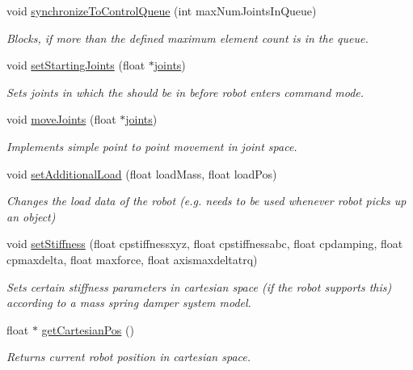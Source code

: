 \begin{DoxyCompactItemize}
void \hyperlink{classKukaControlQueue_a3e59c3d253d2306b5fdde56da529c9cd}{synchronize\-To\-Control\-Queue} (int max\-Num\-Joints\-In\-Queue)
\begin{DoxyCompactList}\small\item\em \-Blocks, if more than the defined maximum element count is in the queue. \end{DoxyCompactList}\item 
void \hyperlink{classKukaControlQueue_ae9b6465ad4c714b305af4eb0b8e69584}{set\-Starting\-Joints} (float $\ast$\hyperlink{fri__example_8m_a094bd681592faefb6f9be3d22d34cbcd}{joints})
\begin{DoxyCompactList}\small\item\em \-Sets joints in which the should be in before robot enters command mode. \end{DoxyCompactList}\item 
void \hyperlink{classKukaControlQueue_a2b9e7cfb4918201e1da5e2a365395e46}{move\-Joints} (float $\ast$\hyperlink{fri__example_8m_a094bd681592faefb6f9be3d22d34cbcd}{joints})
\begin{DoxyCompactList}\small\item\em \-Implements simple point to point movement in joint space. \end{DoxyCompactList}\item 
void \hyperlink{classKukaControlQueue_a0c6a2edd22e222c672668fac5cacb55a}{set\-Additional\-Load} (float load\-Mass, float load\-Pos)
\begin{DoxyCompactList}\small\item\em \-Changes the load data of the robot (e.\-g. needs to be used whenever robot picks up an object) \end{DoxyCompactList}\item 
void \hyperlink{classKukaControlQueue_a82c93a4979d678344337461dd9084725}{set\-Stiffness} (float cpstiffnessxyz, float cpstiffnessabc, float cpdamping, float cpmaxdelta, float maxforce, float axismaxdeltatrq)
\begin{DoxyCompactList}\small\item\em \-Sets certain stiffness parameters in cartesian space (if the robot supports this) according to a mass spring damper system model. \end{DoxyCompactList}\item 
float $\ast$ \hyperlink{classKukaControlQueue_a62475e2d6fd485bfbce095d67bab96c6}{get\-Cartesian\-Pos} ()
\begin{DoxyCompactList}\small\item\em \-Returns current robot position in cartesian space. \end{DoxyCompactList}\item 

\end{DoxyCompactItemize}
